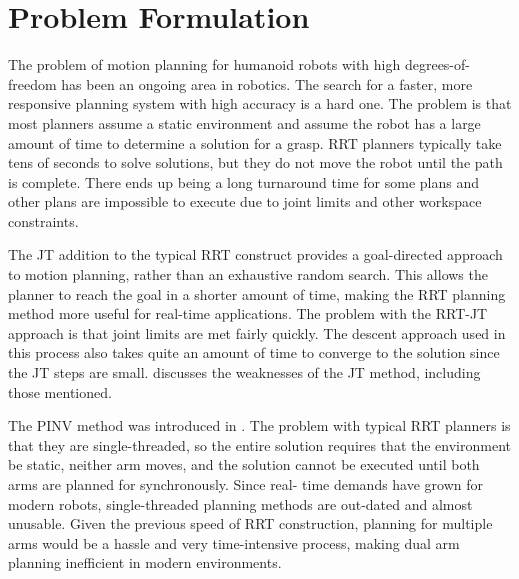 \documentclass[conference]{IEEEtran} \usepackage[T1]{fontenc} \usepackage[backend=biber, style=ieee]{biblatex}
\begin{document}
\section{Problem Formulation} \label{Problem Formulation}

The problem of motion planning for humanoid robots with high degrees-of-freedom has been an ongoing area in robotics. The search for a faster, more responsive
planning system with high accuracy is a hard one. The problem is that most planners assume a static environment and assume the robot has a large amount of time
to determine a solution for a grasp. RRT planners typically take tens of seconds to solve solutions, but they do not move the robot until the path is complete.
There ends up being a long turnaround time for some plans and other plans are impossible to execute due to joint limits and other workspace constraints.

The JT addition to the typical RRT construct provides a goal-directed approach to motion planning, rather than an exhaustive random search. This allows the
planner to reach the goal in a shorter amount of time, making the RRT planning method more useful for real-time applications. The problem with the RRT-JT 
approach is that joint limits are met fairly quickly. The descent approach used in this process also takes quite an amount of time to converge to the solution 
since the JT steps are small. \cite{humanoid_motion_planning} discusses the weaknesses of the JT method, including those mentioned.

The PINV method was introduced in \cite{humanoid_motion_planning}. The problem with typical RRT planners is that they are single-threaded, so the entire solution 
requires that the environment be static, neither arm moves, and the solution cannot be executed until both arms are planned for synchronously. Since real-
time demands have grown for modern robots, single-threaded planning methods are out-dated and almost unusable. Given the previous speed of RRT
construction, planning for multiple arms would be a hassle and very time-intensive process, making dual arm planning inefficient in modern environments.
\end{document}
